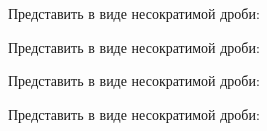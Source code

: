 \begin{enumcols}[label=\textbf{\arabic*.}]
	\item Представить в виде несократимой дроби:
	\begin{enumcols}[itemcolumns=3]
		\item {}
		\item {}
		\item {}
		\item {}
		\item {}
		\item {}
	\end{enumcols}
	\item Представить в виде несократимой дроби:
	\begin{enumcols}[itemcolumns=3]
		\item {}
		\item {}
		\item {}
		\item {}
		\item {}
	\end{enumcols}
	\item Представить в виде несократимой дроби:
	\begin{enumcols}[itemcolumns=3]
		\item {}
		\item {}
		\item {}
		\item {}
		\item {}
	\end{enumcols}
	\item Представить в виде несократимой дроби:
	\begin{enumcols}[itemcolumns=2]
		\item {}
		\item {}
		\item {}
		\item {}
	\end{enumcols}
	\item {}
	\item {}
\end{enumcols}